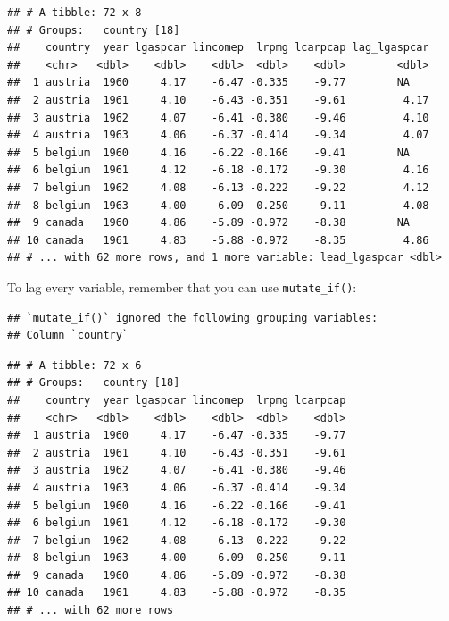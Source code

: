 \documentclass[]{gitbook}
\newenvironment{Shaded}{\begin{snugshade}}{\end{snugshade}}
\newcommand{\DecValTok}[1]{\textcolor[rgb]{0.00,0.00,0.81}{#1}}
\newcommand{\KeywordTok}[1]{\textcolor[rgb]{0.13,0.29,0.53}{\textbf{#1}}}
\newcommand{\NormalTok}[1]{#1}
\newcommand{\OperatorTok}[1]{\textcolor[rgb]{0.81,0.36,0.00}{\textbf{#1}}}
\newcommand{\StringTok}[1]{\textcolor[rgb]{0.31,0.60,0.02}{#1}}
\begin{document}
\begin{verbatim}
## # A tibble: 72 x 8
## # Groups:   country [18]
##    country  year lgaspcar lincomep  lrpmg lcarpcap lag_lgaspcar
##    <chr>   <dbl>    <dbl>    <dbl>  <dbl>    <dbl>        <dbl>
##  1 austria  1960     4.17    -6.47 -0.335    -9.77        NA   
##  2 austria  1961     4.10    -6.43 -0.351    -9.61         4.17
##  3 austria  1962     4.07    -6.41 -0.380    -9.46         4.10
##  4 austria  1963     4.06    -6.37 -0.414    -9.34         4.07
##  5 belgium  1960     4.16    -6.22 -0.166    -9.41        NA   
##  6 belgium  1961     4.12    -6.18 -0.172    -9.30         4.16
##  7 belgium  1962     4.08    -6.13 -0.222    -9.22         4.12
##  8 belgium  1963     4.00    -6.09 -0.250    -9.11         4.08
##  9 canada   1960     4.86    -5.89 -0.972    -8.38        NA   
## 10 canada   1961     4.83    -5.88 -0.972    -8.35         4.86
## # ... with 62 more rows, and 1 more variable: lead_lgaspcar <dbl>
\end{verbatim}

To lag every variable, remember that you can use \texttt{mutate\_if()}:

\begin{Shaded}
\end{Shaded}

\begin{verbatim}
## `mutate_if()` ignored the following grouping variables:
## Column `country`
\end{verbatim}

\begin{verbatim}
## # A tibble: 72 x 6
## # Groups:   country [18]
##    country  year lgaspcar lincomep  lrpmg lcarpcap
##    <chr>   <dbl>    <dbl>    <dbl>  <dbl>    <dbl>
##  1 austria  1960     4.17    -6.47 -0.335    -9.77
##  2 austria  1961     4.10    -6.43 -0.351    -9.61
##  3 austria  1962     4.07    -6.41 -0.380    -9.46
##  4 austria  1963     4.06    -6.37 -0.414    -9.34
##  5 belgium  1960     4.16    -6.22 -0.166    -9.41
##  6 belgium  1961     4.12    -6.18 -0.172    -9.30
##  7 belgium  1962     4.08    -6.13 -0.222    -9.22
##  8 belgium  1963     4.00    -6.09 -0.250    -9.11
##  9 canada   1960     4.86    -5.89 -0.972    -8.38
## 10 canada   1961     4.83    -5.88 -0.972    -8.35
## # ... with 62 more rows
\end{verbatim}
\end{document}
